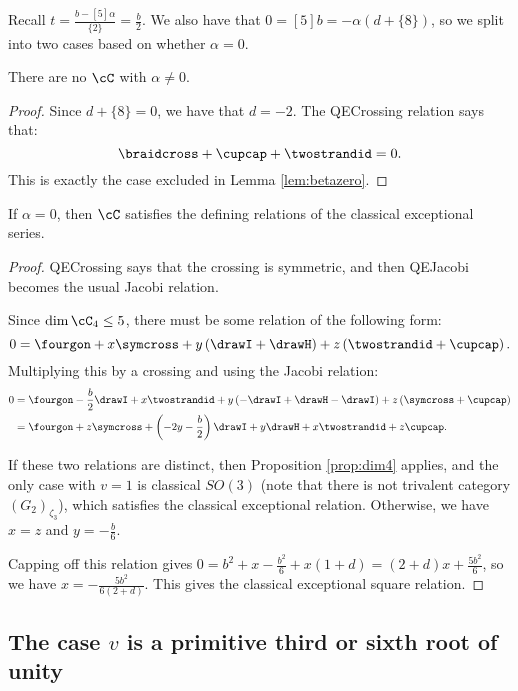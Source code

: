 \documentclass[12pt]{amsart}
\begin{document}
Recall $t = \frac{b-[5]\alpha}{\{2\}} = \frac{b}{2}$.  We also have that $0= [5]b = -\alpha (d+\{8\})$, so we split into two cases based on whether $\alpha = 0$.

\begin{lemma}
There are no $\cC$ with $\alpha \neq 0$.
\end{lemma}
\begin{proof}
Since $d+\{8\}=0$, we have that $d=-2$.  The QECrossing relation says that:
$$\braidcross + \cupcap + \twostrandid = 0.$$
This is exactly the case excluded in Lemma \ref{lem:betazero}.
\end{proof}

\begin{lemma}
If $\alpha = 0$, then $\cC$ satisfies the defining relations of the classical exceptional series.
\end{lemma}
\begin{proof}
QECrossing says that the crossing is symmetric, and then QEJacobi becomes the usual Jacobi relation. 

Since $\dim \cC_4 \leq 5$, there must be some relation of the following form:
$$0 = \fourgon + x \symcross + y \left(\drawI + \drawH \right) + z\left(\twostrandid + \cupcap \right).$$
Multiplying this by a crossing and using the Jacobi relation:
\begin{align*}
0 &= \fourgon - \frac{b}{2} \drawI + x \twostrandid + y \left(-\drawI + \drawH -\drawI \right) + z\left(\symcross + \cupcap \right) 
\\ &= \fourgon + z \symcross + \left(-2y -\frac{b}{2} \right) \drawI +y \drawH +x \twostrandid + z\cupcap. 
\end{align*}

If these two relations are distinct, then Proposition \ref{prop:dim4} applies, and the only case with $v=1$ is classical $SO(3)$ (note that there is not trivalent category $(G_2)_{\zeta_3}$), which satisfies the classical exceptional relation.  Otherwise, we have $x=z$ and $y = -\frac{b}{6}$.  

Capping off this relation gives $0 = b^2 + x -\frac{b^2}{6}+x(1+d) =  (2+d)x +\frac{5 b^2}{6}$, so we have $x = -\frac{5 b^2}{6(2+d)}$.  This gives the classical exceptional square relation.
\end{proof}


\subsection{The case $v$ is a primitive third or sixth root of unity}
\end{document}
